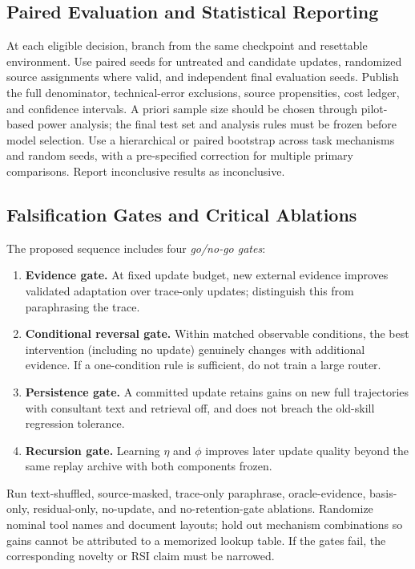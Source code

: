 \subsection{Paired Evaluation and Statistical Reporting}
At each eligible decision, branch from the same checkpoint and
resettable environment. Use paired seeds for untreated and candidate
updates, randomized source assignments where valid, and
independent final evaluation seeds. Publish the full denominator,
technical-error exclusions, source propensities, cost ledger,
and confidence intervals. A priori sample size should be chosen
through pilot-based power analysis; the final test set and
analysis rules must be frozen before model selection.
Use a hierarchical or paired bootstrap across task mechanisms
and random seeds, with a pre-specified correction for multiple
primary comparisons. Report inconclusive results as inconclusive.

\subsection{Falsification Gates and Critical Ablations}
The proposed sequence includes four \emph{go/no-go gates}:
\begin{enumerate}
\item \textbf{Evidence gate.} At fixed update budget, new external
      evidence improves validated adaptation over trace-only
      updates; distinguish this from paraphrasing the trace.
\item \textbf{Conditional reversal gate.} Within matched observable
      conditions, the best intervention (including no update)
      genuinely changes with additional evidence. If a
      one-condition rule is sufficient, do not train a large router.
\item \textbf{Persistence gate.} A committed update retains gains on
      new full trajectories with consultant text and retrieval off,
      and does not breach the old-skill regression tolerance.
\item \textbf{Recursion gate.} Learning $\eta$ and $\phi$ improves
      later update quality beyond the same replay archive with
      both components frozen.
\end{enumerate}

Run text-shuffled, source-masked, trace-only paraphrase,
oracle-evidence, basis-only, residual-only, no-update, and
no-retention-gate ablations. Randomize nominal tool names and
document layouts; hold out mechanism combinations so gains
cannot be attributed to a memorized lookup table. If the gates
fail, the corresponding novelty or RSI claim must be narrowed.

